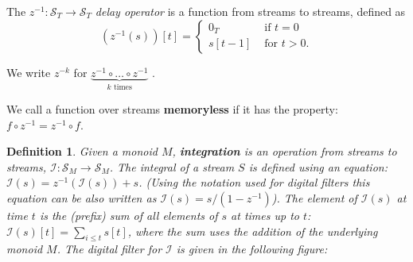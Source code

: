 \documentclass[10pt]{article}
\newtheorem{definition}{Definition}[section]
\newcommand{\stream}[1]{\ensuremath{\mathcal{S}_{#1}}}
\newcommand{\zm}{\ensuremath{z^{-1}}} %
\newcommand{\I}{\mathcal{I}}  %
\begin{document}
The $\zm: \stream{T} \rightarrow \stream{T}$ \emph{delay operator} is
a function from streams to streams, defined as
$$(\zm(s))[t] = \left\{
\begin{array}{ll}
  0_T & \mbox{ if } t = 0 \\
  s[t - 1] & \mbox{ for } t > 0.
\end{array}
\right.
$$


We write $z^{-k}$ for $\underbrace{\zm \circ \ldots \circ \zm}_{k
  \mbox{ times}}$ .

We call a function over streams \textbf{memoryless} if it has the
property: $f \circ \zm = \zm \circ f$.

\begin{definition}
Given a monoid $M$, \textbf{integration} is an operation from streams to
streams, $\I : \stream{M} \rightarrow \stream{M}$.  The integral of a
stream $S$ is defined using an equation: $\I(s) = \zm(\I(s)) + s$.
(Using the notation used for digital filters this equation can be also
written as $\I(s) = s / (1 - \zm)$).  The element of $\I(s)$ at time
$t$ is the (prefix) sum of all elements of $s$ at times up to $t$:
$\I(s)[t] = \sum_{i \leq t} s[t]$, where the sum uses the addition of
the underlying monoid $M$.  The digital filter for $\I$ is given in
the following figure:

\end{definition}
\end{document}
